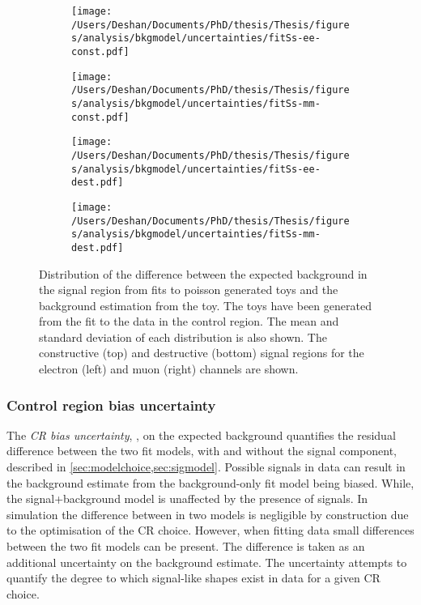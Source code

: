 \begin{figure}[h!]
    \centering
    \begin{subfigure}[b]{0.49\textwidth}
        \centering
        \texttt{[image: /Users/Deshan/Documents/PhD/thesis/Thesis/figures/analysis/bkgmodel/uncertainties/fitSs-ee-const.pdf]}
        \label{fig:bkgmodel:toyss1}
    \end{subfigure}
    \begin{subfigure}[b]{0.49\textwidth}
        \centering
        \texttt{[image: /Users/Deshan/Documents/PhD/thesis/Thesis/figures/analysis/bkgmodel/uncertainties/fitSs-mm-const.pdf]}
        \label{fig:bkgmodel:toyss2}
    \end{subfigure}
    \begin{subfigure}[b]{0.49\textwidth}
        \centering
        \texttt{[image: /Users/Deshan/Documents/PhD/thesis/Thesis/figures/analysis/bkgmodel/uncertainties/fitSs-ee-dest.pdf]}
        \label{fig:bkgmodel:toyss3}
    \end{subfigure}
    \begin{subfigure}[b]{0.49\textwidth}
        \centering
        \texttt{[image: /Users/Deshan/Documents/PhD/thesis/Thesis/figures/analysis/bkgmodel/uncertainties/fitSs-mm-dest.pdf]}
        \label{fig:bkgmodel:toyss4}
    \end{subfigure}
    \caption[Distributions of extrapolation from fit to poisson distributed toys generated in the control region]{Distribution of the difference between the expected background in the signal region from fits to poisson generated toys and the background estimation from the toy. The toys have been generated from the fit to the data in the control region. The mean and standard deviation of each distribution is also shown. The constructive (top) and destructive (bottom) signal regions for the electron (left) and muon (right) channels are shown.}
    \label{fig:bkgmodel:toyss}
\end{figure}

\subsubsection{Control region bias uncertainty}
The \emph{CR bias uncertainty}, \CRBU, on the expected background quantifies the residual difference between the two fit models, with and without the signal component, described in \cref{sec:modelchoice,sec:sigmodel}. Possible signals in data can result in the background estimate from the background-only fit model being biased. While, the signal+background model is unaffected by the presence of signals. In simulation the difference between in two models is negligible by construction due to the optimisation of the CR choice. However, when fitting data small differences between the two fit models can be present. The difference is taken as an additional uncertainty on the background estimate. The uncertainty attempts to quantify the degree to which signal-like shapes exist in data for a given CR choice. 

